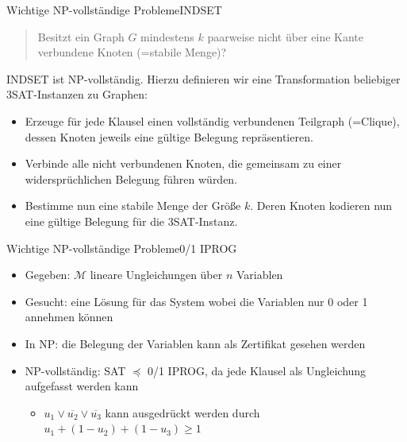 \documentclass[ignorenonframetext,]{beamer}
\begin{document}
\begin{frame}{Wichtige NP-vollständige Probleme}{INDSET}

\begin{quote}
Besitzt ein Graph $G$ mindestens $k$ paarweise nicht über eine Kante
verbundene Knoten (=stabile Menge)?
\end{quote}

INDSET ist NP-vollständig. Hierzu definieren wir eine Transformation
beliebiger 3SAT-Instanzen zu Graphen:

\begin{itemize}
\itemsep1pt\parskip0pt
\item
  Erzeuge für jede Klausel einen vollständig verbundenen Teilgraph
  (=Clique), dessen Knoten jeweils eine gültige Belegung repräsentieren.
\item
  Verbinde alle nicht verbundenen Knoten, die gemeinsam zu einer
  widersprüchlichen Belegung führen würden.
\item
  Bestimme nun eine stabile Menge der Größe $k$. Deren Knoten kodieren
  nun eine gültige Belegung für die 3SAT-Instanz.
\end{itemize}

\end{frame}

\begin{frame}{Wichtige NP-vollständige Probleme}{0/1 IPROG}

\begin{itemize}
\itemsep1pt\parskip0pt
\item
  Gegeben: $\mathcal{M}$ lineare Ungleichungen über $n$ Variablen
\item
  Gesucht: eine Lösung für das System wobei die Variablen nur 0 oder 1
  annehmen können
\item
  In NP: die Belegung der Variablen kann als Zertifikat gesehen werden
\item
  NP-vollständig: SAT $\preceq$ 0/1 IPROG, da jede Klausel als
  Ungleichung aufgefasst werden kann

  \begin{itemize}
  \itemsep1pt\parskip0pt
  \item
    $u_1 \vee \overline{u_2} \vee \overline{u_3}$ kann ausgedrückt
    werden durch $u_1 + (1 - u_2) + (1 - u_3) \geq 1$
  \end{itemize}
\end{itemize}

\end{frame}
\end{document}
